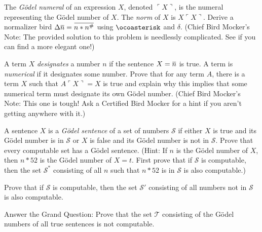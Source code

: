 \documentclass[12pt, letterpaper]{article}
\begin{document}
\begin{prob}{25.2}
The \emph{G\"odel numeral} of an expression $X$, denoted $\ulcorner X \urcorner$, is the numeral representing the G\"odel number of $X$. The \emph{norm} of $X$ is $X\ulcorner X \urcorner$. Derive a normalizer bird $\Delta \noverline{n} = \noverline{n \ast n^\#}$ using $\ocoasterisk$ and $\delta$. (Chief Bird Mocker's Note: The provided solution to this problem is needlessly complicated. See if you can find a more elegant one!)
\end{prob}

\begin{prob}{25.3}
A term $X$ \emph{designates} a number $n$ if the sentence $X = \noverline{n}$ is true. A term is \emph{numerical} if it designates some number. Prove that for any term $A$, there is a term $X$ such that $A\ulcorner X \urcorner = X$ is true and explain why this implies that some numerical term must designate its own G\"odel number. (Chief Bird Mocker's Note: This one is tough! Ask a Certified Bird Mocker for a hint if you aren't getting anywhere with it.)
\end{prob}

\begin{prob}{25.4}
A sentence $X$ is a \emph{G\"odel sentence} of a set of numbers $\mathcal{S}$ if either $X$ is true and its G\"odel number is in $\mathcal{S}$ or $X$ is false and its G\"odel number is not in $\mathcal{S}$. Prove that every computable set has a G\"odel sentence. (Hint: If $n$ is the G\"odel number of $X$, then $n \ast 52$ is the G\"odel number of $X = t$. First prove that if $\mathcal{S}$ is computable, then the set $\mathcal{S}^*$ consisting of all $n$ such that $n \ast 52$ is in $\mathcal{S}$ is also computable.)
\end{prob}

\begin{prob}{25.5}
Prove that if $\mathcal{S}$ is computable, then the set $\mathcal{S}'$ consisting of all numbers not in $\mathcal{S}$ is also computable.
\end{prob}

\begin{prob}{25.5}
Answer the Grand Question: Prove that the set $\mathcal{T}$ consisting of the  G\"odel numbers of all true sentences is not computable.
\end{prob}
\end{document}
